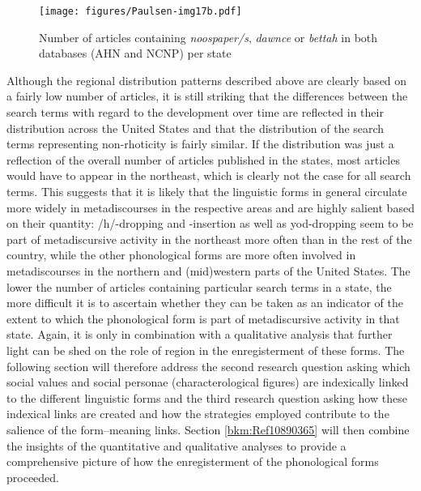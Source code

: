 \begin{figure}
\texttt{[image: figures/Paulsen-img17b.pdf]}
\caption{
Number of articles containing \textit{noospaper/s}, \textit{dawnce} or \textit{bettah} in both databases (AHN and NCNP) per state
}
\label{fig:key:17b}
\end{figure}
Although the regional distribution patterns described above are clearly based on a fairly low number of articles, it is still striking that the differences between the search terms with regard to the development over time are reflected in their distribution across the United States and that the distribution of the search terms representing non-rhoticity is fairly similar. If the distribution was just a reflection of the overall number of articles published in the states, most articles would have to appear in the northeast, which is clearly not the case for all search terms. This suggests that it is likely that the linguistic forms in general circulate more widely in metadiscourses in the respective areas and are highly salient based on their quantity: /h/-dropping and -insertion as well as yod-dropping seem to be part of metadiscursive activity in the northeast more often than in the rest of the country, while the other phonological forms are more often involved in metadiscourses in the northern and (mid)western parts of the United States. The lower the number of articles containing particular search terms in a state, the more difficult it is to ascertain whether they can be taken as an indicator of the extent to which the phonological form is part of metadiscursive activity in that state. Again, it is only in combination with a qualitative analysis that further light can be shed on the role of region in the enregisterment of these forms. The following section will therefore address the second research question asking which social values and social personae (characterological figures) are indexically linked to the different linguistic forms and the third research question asking how these indexical links are created and how the strategies employed contribute to the salience of the form–meaning links. Section \ref{bkm:Ref10890365} will then combine the insights of the quantitative and qualitative analyses to provide a comprehensive picture of how the enregisterment of the phonological forms proceeded.


